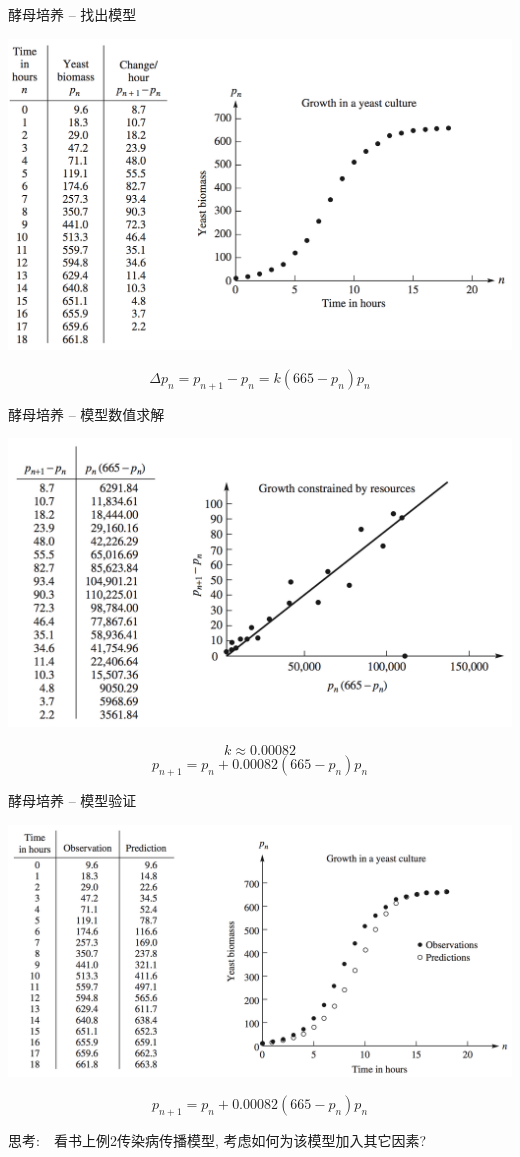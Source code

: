 \documentclass[UTF8, mathserif]{ctexbeamer}
\begin{document}
\begin{frame}{酵母培养 -- 找出模型}
  \begin{center}
    \includegraphics[width=.8\textwidth{}]{yeast.png}
  \end{center}

  \[
  \Delta p_n = p_{n+1} - p_n = k(665 - p_n)p_n
  \]
\end{frame}

\begin{frame}{酵母培养 -- 模型数值求解}
  \begin{center}
    \includegraphics[width=.8\textwidth{}]{yeast-fit.png}
  \end{center}
  \[
  k \approx 0.00082
  \]
  \[
  p_{n+1} = p_n + 0.00082(665 - p_n)p_n
  \]  
\end{frame}

\begin{frame}{酵母培养 -- 模型验证}
  \begin{center}
    \includegraphics[width=.8\textwidth{}]{yeast-verify.png}
  \end{center}
  \[
  p_{n+1} = p_n + 0.00082(665 - p_n)p_n
  \]

思考:　看书上例2传染病传播模型, 考虑如何为该模型加入其它因素?
\end{frame}
\end{document}

